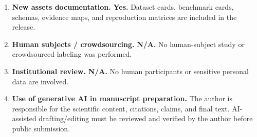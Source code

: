 \begin{enumerate}
\item \textbf{New assets documentation.} \textbf{Yes.} Dataset cards, benchmark cards, schemas, evidence maps, and reproduction matrices are included in the release.
\item \textbf{Human subjects / crowdsourcing.} \textbf{N/A.} No human-subject study or crowdsourced labeling was performed.
\item \textbf{Institutional review.} \textbf{N/A.} No human participants or sensitive personal data are involved.
\item \textbf{Use of generative AI in manuscript preparation.} The author is responsible for the scientific content, citations, claims, and final text. AI-assisted drafting/editing must be reviewed and verified by the author before public submission.
\end{enumerate}
\normalsize

